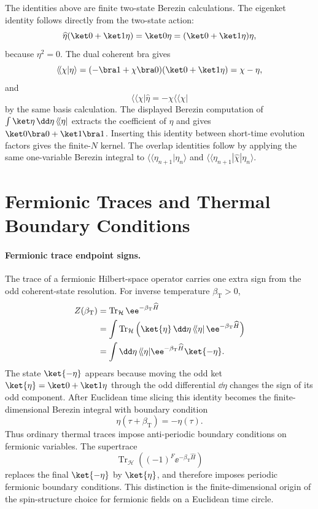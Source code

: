 The identities above are finite two-state Berezin calculations.  The eigenket
identity follows directly from the two-state action:
\[
  \widehat\eta(\ket0+\ket1\eta)=\ket0\eta=(\ket0+\ket1\eta)\eta,
\]
because \(\eta^2=0\).  The dual coherent bra gives
\[
  \langle\!\langle\chi|\eta\rangle
  =
  (-\bra1+\chi\bra0)(\ket0+\ket1\eta)
  =
  \chi-\eta,
\]
and
\[
  \langle\!\langle\chi|\widehat\eta=-\chi\langle\!\langle\chi|
\]
by the same basis calculation.  The displayed Berezin computation of
\(\int\ket\eta\,\dd\eta\,\langle\!\langle\eta|\) extracts the coefficient of
\(\eta\) and gives \(\ket0\bra0+\ket1\bra1\).  Inserting this identity between
short-time evolution factors gives the finite-\(N\) kernel. The overlap
identities follow by applying the same one-variable Berezin integral to
\(\langle\!\langle\eta_{n+1}|\eta_n\rangle\) and
\(\langle\!\langle\eta_{n+1}|\widehat\chi|\eta_n\rangle\).

\section{Fermionic Traces and Thermal Boundary Conditions}

\paragraph{Fermionic trace endpoint signs.}
The trace of a fermionic Hilbert-space operator carries one extra sign from
the odd coherent-state resolution. For inverse temperature
\(\beta_{\mathrm T}>0\),
\[
\begin{aligned}
  Z(\beta_{\mathrm T})
  &=
  \operatorname{Tr}_{\mathcal H}\ee^{-\beta_{\mathrm T}\widehat H}        \\
  &=
  \int
  \operatorname{Tr}_{\mathcal H}
  \left(
    \ket{\eta}\,\dd\eta\,\langle\!\langle\eta|\,
    \ee^{-\beta_{\mathrm T}\widehat H}
  \right)                                      \\
  &=
  \int\dd\eta\,
  \langle\!\langle\eta|
  \ee^{-\beta_{\mathrm T}\widehat H}
  \ket{-\eta}.
\end{aligned}
\]
The state \(\ket{-\eta}\) appears because moving the odd ket
\(\ket{\eta}=\ket0+\ket1\eta\) through the odd differential \(\dd\eta\)
changes the sign of its odd component. After Euclidean time slicing this
identity becomes the finite-dimensional Berezin integral with boundary
condition
\[
  \eta(\tau+\beta_{\mathrm T})=-\eta(\tau).
\]
Thus ordinary thermal traces impose anti-periodic boundary conditions on
fermionic variables. The supertrace
\[
  \operatorname{Tr}_{\mathcal H}
  \left((-1)^F\ee^{-\beta_{\mathrm T}\widehat H}\right)
\]
replaces the final \(\ket{-\eta}\) by \(\ket{\eta}\), and therefore imposes
periodic fermionic boundary conditions. This distinction is the
finite-dimensional origin of the spin-structure choice for fermionic fields
on a Euclidean time circle.

